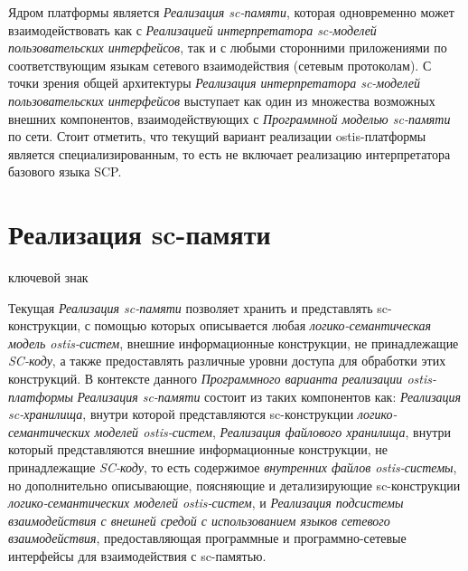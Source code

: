 Ядром платформы является \textit{Реализация sc-памяти}, которая одновременно может взаимодействовать как с \textit{Реализацией интерпретатора sc-моделей пользовательских интерфейсов}, так и с любыми сторонними приложениями по соответствующим языкам сетевого взаимодействия (сетевым протоколам). С точки зрения общей архитектуры \textit{Реализация интерпретатора sc-моделей пользовательских интерфейсов} выступает как один из множества возможных внешних компонентов, взаимодействующих с \textit{Программной моделью sc-памяти} по сети. Стоит отметить, что текущий вариант реализации ostis-платформы является специализированным, то есть не включает реализацию интерпретатора базового языка SCP.

\section{Реализация sc-памяти}
\label{sec_soft_platform_sc_memory}

\begin{SCn}
	
\begin{scnrelfromlist}{ключевой знак}
\end{scnrelfromlist}

\end{SCn}

\bigskip

Текущая \textit{Реализация sc-памяти} позволяет хранить и представлять sc-конструкции, с помощью которых описывается любая \textit{логико-семантическая модель ostis-систем}, внешние информационные конструкции, не принадлежащие \textit{SC-коду}, а также предоставлять различные уровни доступа для обработки этих конструкций. В контексте данного \textit{Программного варианта реализации ostis-платформы} \textit{Реализация sc-памяти} состоит из таких компонентов как: \textit{Реализация sc-хранилища}, внутри которой представляются sc-конструкции \textit{логико-семантических моделей ostis-систем}, \textit{Реализация файлового хранилища}, внутри который представляются внешние информационные конструкции, не принадлежащие \textit{SC-коду}, то есть содержимое \textit{внутренних файлов ostis-системы}, но дополнительно описывающие, поясняющие и детализирующие sc-конструкции \textit{логико-семантических моделей ostis-систем}, и \textit{Реализация подсистемы взаимодействия с внешней средой с использованием языков сетевого взаимодействия}, предоставляющая программные и программно-сетевые интерфейсы для взаимодействия с sc-памятью.

